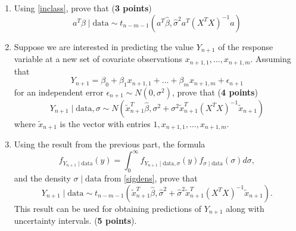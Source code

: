 \documentclass{scrartcl}
\begin{document}
\begin{enumerate}
\begin{enumerate}
\item Using  \eqref{inclass}, prove that  (\textbf{3 points})
  \begin{equation*}
a^T  \beta \mid \text{data} \sim t_{n-m-1} \left(a^T 
      \hat{\beta},
      \hat{\sigma}^2 a^T \left(X^T
      X \right)^{-1} a\right)
\end{equation*}

\item Suppose we are interested in predicting the value $Y_{n+1}$ of
  the response variable at a new set of covariate observations
  $x_{n+1, 1}, \dots, x_{n+1, m}$. Assuming that
  \begin{equation*}
    Y_{n+1} = \beta_0 + \beta_1 x_{n+1, 1} + \dots + \beta_m x_{n+1,
      m} + \epsilon_{n+1} 
  \end{equation*}
  for an independent error $\epsilon_{n+1} \sim N(0, \sigma^2)$, prove that
  (\textbf{4 points}) 
  \begin{equation*}
    Y_{n+1} \mid \text{data}, \sigma \sim N \left(
      \tilde{x}_{n+1}^T \hat{\beta},
\sigma^2 +      \sigma^2 \tilde{x}_{n+1}^T \left(X^T
      X \right)^{-1} \tilde{x}_{n+1} \right) 
\end{equation*}
where $\tilde{x}_{n+1}$ is the vector with entries $1, x_{n+1, 1},
\dots, x_{n+1, m}$. 

\item Using the result from the previous part, the formula
  \begin{equation*}
    f_{Y_{n+1} \mid \text{data}}(y) = \int_0^{\infty} f_{Y_{n+1} \mid
      \text{data}, \sigma}(y) f_{\sigma \mid \text{data}}(\sigma)
    d\sigma, 
  \end{equation*}
  and the density $\sigma \mid \text{data}$ from \eqref{sigdens}, 
  prove that  
  \begin{equation*}
    Y_{n+1} \mid \text{data} \sim t_{n-m-1} \left(
 \tilde{x}_{n+1}^T \hat{\beta},
\hat{\sigma}^2 +      \hat{\sigma}^2  \tilde{x}_{n+1}^T \left(X^T
      X \right)^{-1} \tilde{x}_{n+1}\right). 
\end{equation*}
This result can be used for obtaining predictions of $Y_{n+1}$ along
with uncertainty intervals.    (\textbf{5 points}). 
  \end{enumerate}



  
  
\end{enumerate}
\end{document}
